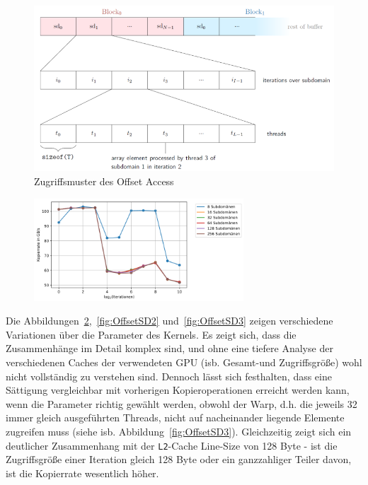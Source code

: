 \documentclass[11pt, abstract=on]{scrartcl}
\begin{document}
\begin{figure} [htbp]
 	\centering
 		\includegraphics[width=1.0\textwidth]{Graph_OffsetAccessZugriff.png}
 	\caption{Zugriffsmuster des Offset Access}
 	\label{fig:OffsetZugriff}
\end{figure}

\begin{figure} [htbp]
 	\centering
 		\includegraphics[width=0.7\textwidth]{Graph_OffsetAccessSDpBlock2.png}
 	\caption{}
 	\label{fig:OffsetSD1}
\end{figure}

Die Abbildungen~\ref{fig:OffsetSD1},~\ref{fig:OffsetSD2} und~\ref{fig:OffsetSD3} zeigen verschiedene Variationen über die Parameter des Kernels. Es zeigt sich, dass die Zusammenhänge im Detail komplex sind, und ohne eine tiefere Analyse der verschiedenen Caches der verwendeten GPU (isb. Gesamt-und Zugriffsgröße) wohl nicht vollständig zu verstehen sind. Dennoch lässt sich festhalten, dass eine Sättigung vergleichbar mit vorherigen Kopieroperationen erreicht werden kann, wenn die Parameter richtig gewählt werden, obwohl der Warp, d.h. die jeweils 32 immer gleich ausgeführten Threads, nicht auf nacheinander liegende Elemente zugreifen muss (siehe isb. Abbildung~\ref{fig:OffsetSD3}). Gleichzeitig zeigt sich ein deutlicher Zusammenhang mit der \texttt{L2}-Cache Line-Size von 128 Byte - ist die Zugriffsgröße einer Iteration gleich 128 Byte oder ein ganzzahliger Teiler davon, ist die Kopierrate wesentlich höher.
\end{document}
